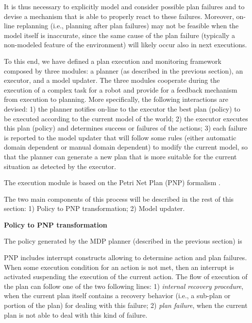 It is thus necessary to explicitly model and consider possible plan failures and to devise a mechanism that is able to properly react to these failures. Moreover, on-line replanning (i.e., planning after plan failures) may not be feasible when the model itself is inaccurate, since the same cause of the plan failure (typically a non-modeled feature of the environment) will likely occur also in next executions.

To this end, we have defined a plan execution and monitoring framework composed by three modules: a planner (as described in the previous section), an executor, and a model updater. The three modules cooperate during the execution of a complex task for a robot and provide for a feedback mechanism from execution to planning.
More specifically, the following interactions are devised:
1) the planner notifies on-line to the executor the best plan (policy) to be executed according to the current model of the world; 2) the executor executes this plan (policy) and determines success or failures of the actions; 3) each failure is reported to the model updater that will follow some rules (either automatic domain dependent or manual domain dependent) to modify the current model, so that the planner can generate a new plan that is more suitable for the current situation as detected by the executor.

The execution module is based on the Petri Net Plan (PNP) formalism \cite{ZiIo11PNP}. 




The two main components of this process will be described in the rest of this section:
1) Policy to PNP transformation; 2) Model updater.

\vspace{1em}
\noindent
{\bf Policy to PNP transformation}

The policy generated by the MDP planner (described in the previous section) is 


PNP includes interrupt constructs allowing to determine action and plan failures.
When some execution condition for an action is not met, then an interrupt is activated
suspending the execution of the current action. The flow of execution of the plan can follow one of the two following lines: 1) \emph{internal recovery procedure}, when the current plan itself contains a recovery behavior (i.e., a sub-plan or portion of the plan) for dealing with this failure; 2) \emph{plan failure}, when the current plan is not able to deal with this kind of failure.

